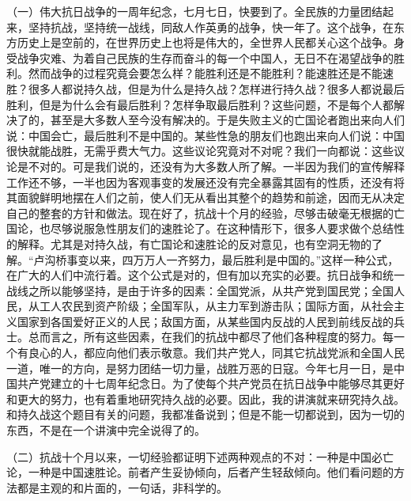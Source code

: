 \documentclass[UTF8, 12pt, a4paper]{ctexrep}
\begin{document}
（一）伟大抗日战争的一周年纪念，七月七日，快要到了。全民族的力量团结起来，坚持抗战，坚持统一战线，同敌人作英勇的战争，快一年了。这个战争，在东方历史上是空前的，在世界历史上也将是伟大的，全世界人民都关心这个战争。身受战争灾难、为着自己民族的生存而奋斗的每一个中国人，无日不在渴望战争的胜利。然而战争的过程究竟会要怎么样？能胜利还是不能胜利？能速胜还是不能速胜？很多人都说持久战，但是为什么是持久战？怎样进行持久战？很多人都说最后胜利，但是为什么会有最后胜利？怎样争取最后胜利？这些问题，不是每个人都解决了的，甚至是大多数人至今没有解决的。于是失败主义的亡国论者跑出来向人们说：中国会亡，最后胜利不是中国的。某些性急的朋友们也跑出来向人们说：中国很快就能战胜，无需乎费大气力。这些议论究竟对不对呢？我们一向都说：这些议论是不对的。可是我们说的，还没有为大多数人所了解。一半因为我们的宣传解释工作还不够，一半也因为客观事变的发展还没有完全暴露其固有的性质，还没有将其面貌鲜明地摆在人们之前，使人们无从看出其整个的趋势和前途，因而无从决定自己的整套的方针和做法。现在好了，抗战十个月的经验，尽够击破毫无根据的亡国论，也尽够说服急性朋友们的速胜论了。在这种情形下，很多人要求做个总结性的解释。尤其是对持久战，有亡国论和速胜论的反对意见，也有空洞无物的了解。“卢沟桥事变以来，四万万人一齐努力，最后胜利是中国的。”这样一种公式，在广大的人们中流行着。这个公式是对的，但有加以充实的必要。抗日战争和统一战线之所以能够坚持，是由于许多的因素：全国党派，从共产党到国民党；全国人民，从工人农民到资产阶级；全国军队，从主力军到游击队；国际方面，从社会主义国家到各国爱好正义的人民；敌国方面，从某些国内反战的人民到前线反战的兵士。总而言之，所有这些因素，在我们的抗战中都尽了他们各种程度的努力。每一个有良心的人，都应向他们表示敬意。我们共产党人，同其它抗战党派和全国人民一道，唯一的方向，是努力团结一切力量，战胜万恶的日寇。今年七月一日，是中国共产党建立的十七周年纪念日。为了使每个共产党员在抗日战争中能够尽其更好和更大的努力，也有着重地研究持久战的必要。因此，我的讲演就来研究持久战。和持久战这个题目有关的问题，我都准备说到；但是不能一切都说到，因为一切的东西，不是在一个讲演中完全说得了的。

（二）抗战十个月以来，一切经验都证明下述两种观点的不对：一种是中国必亡论，一种是中国速胜论。前者产生妥协倾向，后者产生轻敌倾向。他们看问题的方法都是主观的和片面的，一句话，非科学的。
\end{document}
